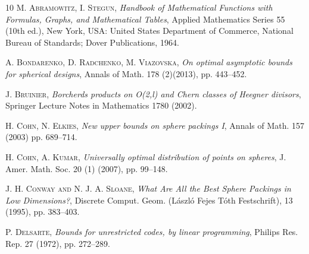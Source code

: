 \documentclass{scrartcl}
\begin{document}
\begin{thebibliography}{10}
 \textsc{ M. Abramowitz, I. Stegun}, \emph{ Handbook of Mathematical Functions with Formulas, Graphs, and Mathematical Tables}, Applied Mathematics Series 55 (10th ed.), New York, USA: United States Department of Commerce, National Bureau of Standards; Dover Publications, 1964.

 \textsc{ A. Bondarenko, D. Radchenko, M. Viazovska},
\emph{On optimal asymptotic bounds for spherical designs}, Annals of Math. 178 (2)(2013), pp. 443--452.

 \textsc{ J. Bruinier}, \emph{Borcherds products on O(2,l) and Chern classes of Heegner divisors}, Springer Lecture Notes in Mathematics 1780 (2002).

  \textsc{ H. Cohn, N. Elkies}, \emph{New upper bounds on sphere packings I}, Annals of Math. 157 (2003) pp. 689--714.


 \textsc{ H. Cohn, A. Kumar}, \emph{Universally optimal distribution of points on spheres},
J. Amer. Math. Soc. 20 (1) (2007), pp. 99--148.

  \textsc{ J. H. Conway and N. J. A. Sloane}, \emph{What Are All the Best Sphere Packings in Low Dimensions?}, Discrete Comput. Geom. (L{\'a}szl{\'o} Fejes T{\'o}th Festschrift), 13 (1995), pp. 383--403.







 \textsc{ P. Delsarte},
\emph{Bounds for unrestricted codes, by linear programming}, Philips Res.
Rep. 27 (1972), pp. 272--289.



\end{thebibliography}
\end{document}
